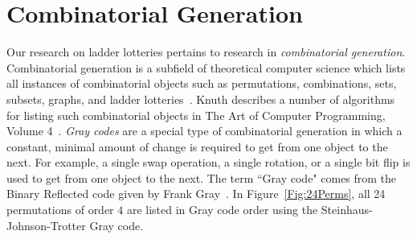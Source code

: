 \section{Combinatorial Generation}
Our research on ladder lotteries pertains to research in \emph{combinatorial generation}. Combinatorial 
generation is a subfield of theoretical computer science which lists all instances of  
combinatorial objects such as permutations, combinations, sets, subsets, graphs, and ladder lotteries~\cite{A42}. Knuth describes a number 
of algorithms for listing such combinatorial objects in The Art of Computer Programming, Volume 4~\cite{A37}. \emph{Gray codes} are a 
special type of combinatorial generation in which a constant, minimal amount of change 
is required to get from one object to the next. For example, a single swap operation,
a single rotation, or a single bit flip is used to get from one object to the next. The term
``Gray code" comes from the Binary Reflected code given by Frank Gray~\cite{A39}. 
In Figure~\ref{Fig:24Perms}, all 24 permutations of order $4$ are listed in Gray code order using the Steinhaus-Johnson-Trotter Gray code.\par
